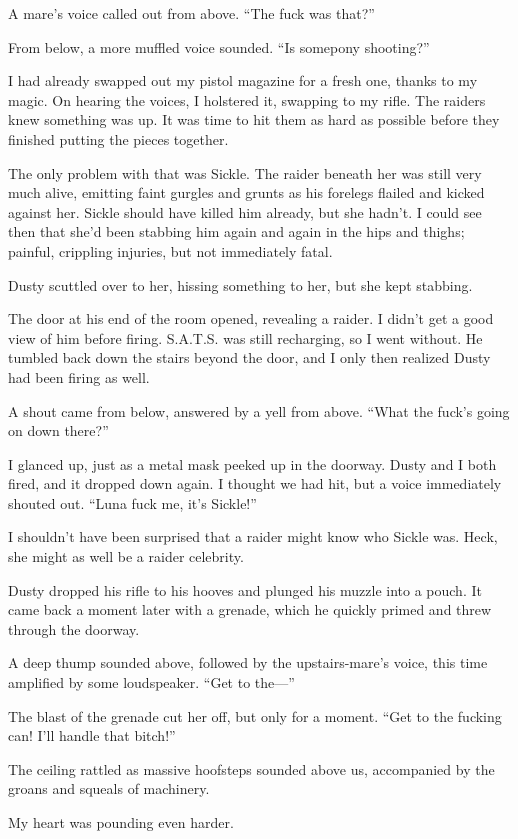 A mare’s voice called out from above. “The fuck was that?”

From below, a more muffled voice sounded. “Is somepony shooting?”

I had already swapped out my pistol magazine for a fresh one, thanks to my magic. On hearing the voices, I holstered it, swapping to my rifle. The raiders knew something was up. It was time to hit them as hard as possible before they finished putting the pieces together.

The only problem with that was Sickle. The raider beneath her was still very much alive, emitting faint gurgles and grunts as his forelegs flailed and kicked against her. Sickle should have killed him already, but she hadn’t. I could see then that she’d been stabbing him again and again in the hips and thighs; painful, crippling injuries, but not immediately fatal.

Dusty scuttled over to her, hissing something to her, but she kept stabbing.

The door at his end of the room opened, revealing a raider. I didn’t get a good view of him before firing. S.A.T.S. was still recharging, so I went without. He tumbled back down the stairs beyond the door, and I only then realized Dusty had been firing as well.

A shout came from below, answered by a yell from above. “What the fuck’s going on down there?”

I glanced up, just as a metal mask peeked up in the doorway. Dusty and I both fired, and it dropped down again. I thought we had hit, but a voice immediately shouted out. “Luna fuck me, it’s Sickle!”

I shouldn’t have been surprised that a raider might know who Sickle was. Heck, she might as well be a raider celebrity.

Dusty dropped his rifle to his hooves and plunged his muzzle into a pouch. It came back a moment later with a grenade, which he quickly primed and threw through the doorway.

A deep thump sounded above, followed by the upstairs-mare’s voice, this time amplified by some loudspeaker. “Get to the—”

The blast of the grenade cut her off, but only for a moment. “Get to the fucking can! I’ll handle that bitch!”

The ceiling rattled as massive hoofsteps sounded above us, accompanied by the groans and squeals of machinery.

My heart was pounding even harder.

